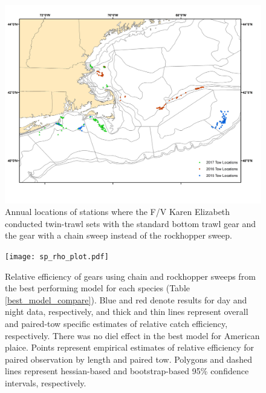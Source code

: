 \documentclass[
  12pt,
]{article}
\begin{document}
\begin{landscape}
\begin{figure}
\caption{Annual locations of stations where the F/V Karen Elizabeth conducted twin-trawl sets with the standard bottom trawl gear and the gear with a chain sweep instead of the rockhopper sweep.}\label{tow_locations}
\begin{center}
\includegraphics[width = \textwidth]{TwinTrawlLocationsAllYears.jpg}
\end{center}
\end{figure}
\end{landscape}

\clearpage

\begin{figure}
\caption{Relative efficiency  of gears using chain and rockhopper sweeps from the best performing model for each species (Table \ref{best_model_compare}). Blue and red denote results for day and night data, respectively, and thick and thin lines represent overall and paired-tow specific estimates of relative catch efficiency, respectively. There was no diel effect in the best model for American plaice. Points represent empirical estimates of relative efficiency for paired observation by length and paired tow. Polygons and dashed lines represent hessian-based and bootstrap-based 95\% confidence intervals, respectively.}\label{sp_rho_plot}
\begin{center}
\texttt{[image: sp\_rho\_plot.pdf]}
\end{center}
\end{figure}
\end{document}
